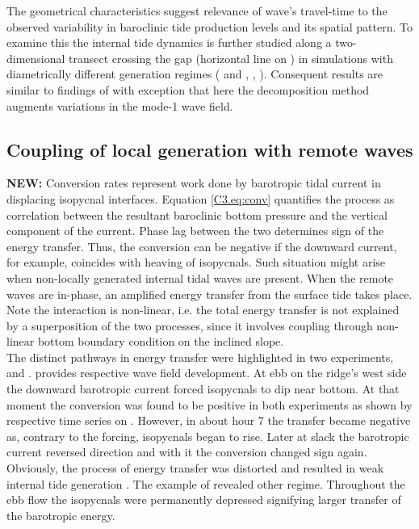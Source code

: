 \documentclass[12pt]{article}
\begin{document}
The geometrical characteristics suggest relevance of wave's travel-time to the observed variability in baroclinic tide 
production levels and its spatial pattern. To examine this the internal tide dynamics is further 
studied along a two-dimensional transect crossing the gap (horizontal line on 
) in simulations with diametrically different generation regimes ( 
and , , ). Consequent 
results are similar to findings of \cite{echeverri2010internal, buijsman2012double} with 
exception that here the decomposition method augments variations in the mode-1 wave field.\\


\subsection{Coupling of local generation with remote waves}
\label{C3.sec:amp_mech}
\textbf{NEW:}
\newpage
Conversion rates represent work done by barotropic tidal current in displacing isopycnal 
interfaces. Equation \ref{C3.eq:conv} quantifies the process as correlation 
between the 
resultant 
baroclinic bottom pressure and the vertical component of the current. Phase lag between the two  
determines sign of the energy transfer. Thus, the conversion can be negative 
if the downward current, for example, coincides with heaving of isopycnals. Such situation 
might arise when non-locally generated internal tidal waves are present. When 
the remote waves are in-phase, an amplified energy transfer from the surface tide takes place. Note 
the 
interaction 
is non-linear, i.e. the total energy transfer is not explained by a superposition of the two 
processes, 
since it involves coupling through non-linear bottom boundary condition on the inclined slope.\\

The distinct pathways in energy transfer were highlighted in two experiments,  and 
.  provides respective wave field development. At ebb on the 
ridge's west side  the downward barotropic current forced isopycnals 
to 
dip near bottom. 
At that moment the conversion was found to be positive in both experiments as shown by respective 
time series 
on . However, in  about hour 7 the transfer became negative as, 
contrary to the forcing, isopycnals began to rise. Later at slack  the 
barotropic current reversed direction and with it the conversion changed sign again. Obviously, 
the process of energy transfer was distorted and resulted in weak internal tide generation 
. 
The example of  revealed other regime. Throughout the ebb flow the isopycnals 
were permanently depressed signifying larger transfer of the barotropic energy.\\
\end{document}
